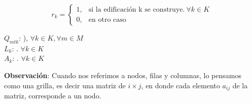 \documentclass[letterpaper]{article}
\begin{document}
$$
r_{k}=\begin{cases}
			1, & \text{si la edificación k se construye}.\ \forall k \in K\\
            0, & \text{en otro caso}
		 \end{cases}
$$

\begin{flushleft}
	$Q_{mtk}$: ), $\forall k \in K, \forall m \in M$\\
	$L_{k}$: . $\forall k \in K$\\
	$A_{k}$: . $\forall k \in K$\\
\end{flushleft}
\textbf{Observación}: Cuando nos referimos a nodos, filas y columnas, lo pensamos como una grilla, es decir una matriz de $i \times j$, en donde cada elemento $a_{ij}$ de la matriz, corresponde a un nodo.
\end{document}
